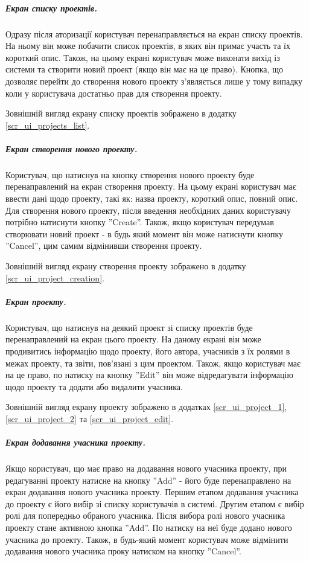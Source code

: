 \documentclass[../main.tex]{subfiles}
\begin{document}
		\subparagraph{Екран списку проектів.}
		
			Одразу після аторизації користувач перенаправляється на екран списку проектів. На ньому він може побачити список проектів, в яких він примає участь та їх короткий опис. Також, на цьому екрані користувач може виконати вихід із системи та створити новий проект (якщо він має на це право). Кнопка, що дозволяє перейти до створення нового проекту з'являється лише у тому випадку коли у користувача достатньо прав для створення проекту.
			
			Зовнішній вигляд екрану списку проектів зображено в додатку \ref{scr_ui_projects_list}.
			
		\subparagraph{Екран створення нового проекту.}
		
			Користувач, що натиснув на кнопку створення нового проекту буде перенаправлений на екран створення проекту. На цьому екрані користувач має ввести дані щодо проекту, такі як: назва проекту, короткий опис, повний опис. Для створення нового проекту, після введення необхідних даних користувачу потрібно натиснути кнопку ''Create''. Також, якщо користувач передумав створювати новий проект - в будь який момент він може натиснути кнопку ''Cancel'', цим самим відмінивши створення проекту.
			
			Зовнішній вигляд екрану створення проекту зображено в додатку \ref{scr_ui_project_creation}.
	
		\subparagraph{Екран проекту.}
		
			Користувач, що натиснув на деякий проект зі списку проектів буде перенаправлений на екран цього проекту. На даному екрані він може продивитись інформацію щодо проекту, його автора, учасників з їх ролями в межах проекту, та звіти, пов'язані з цим проектом. Також, якщо користувач має на це право, по натиску на кнопку ''Edit'' він може відредагувати інформацію щодо проекту та додати або видалити учасника.
			
			Зовнішній вигляд екрану проекту зображено в додатках \ref{scr_ui_project_1}, \ref{scr_ui_project_2} та \ref{scr_ui_project_edit}.
	
		\subparagraph{Екран додавання учасника проекту.}
		
			Якщо користувач, що має право на додавання нового учасника проекту, при редагуванні проекту натисне на кнопку ''Add'' - його буде перенаправлено на екран додавання нового учасника проекту. Першим етапом додавання учасника до проекту є його вибір зі списку користувачів в системі. Другим етапом є вибір ролі для попередньо обраного учасника. Після вибора ролі нового учасника проекту стане активною кнопка ''Add''. По натиску на неї буде додано нового учасника до проекту. Також, в будь-який момент користувач може відмінити додавання нового учасника проку натиском на кнопку ''Cancel''.
			
\end{document}

